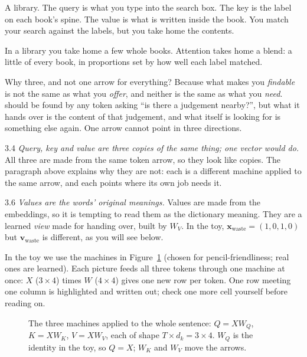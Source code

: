 \Picture A library. The query is what you type into the search box. The key is the label on each book's spine.
The value is what is written inside the book. You match your search against the labels, but you take home the
contents.

\begin{breaks}
In a library you take home a few whole books. Attention takes home a blend: a little of every book, in
proportions set by how well each label matched.
\end{breaks}

\Why Why three, and not one arrow for everything? Because what makes you \emph{findable} is not the same as what
you \emph{offer}, and neither is the same as what you \emph{need}.  should be found by any token asking
``is there a judgement nearby?'', but what it hands over is the content of that judgement, and what 
itself is looking for is something else again. One arrow cannot point in three directions.

\begin{wrongidea}{3.4}
\emph{Query, key and value are three copies of the same thing; one vector would do.} All three are made from the
same token arrow, so they look like copies. The paragraph above explains why they are not: each is a different
machine applied to the same arrow, and each points where its own job needs it.
\end{wrongidea}

\begin{wrongidea}{3.6}
\emph{Values are the words' original meanings.} Values are made from the embeddings, so it is tempting to read
them as the dictionary meaning. They are a learned \emph{view} made for handing over, built by $W_V$. In the toy,
$\bm{x}_{\text{waste}}=(1,0,1,0)$ but $\bm{v}_{\text{waste}}$ is different, as you will see below.
\end{wrongidea}

In the toy we use the machines in Figure~\ref{fig:qkv} (chosen for pencil-friendliness; real ones are
learned). Each picture feeds all three tokens through one machine at once: $X$ ($3\times4$) times $W$ ($4\times4$)
gives one new row per token. One row meeting one column is highlighted and written out; check one more cell
yourself before reading on.
\begin{figure}[!htb]\centering

\caption{The three machines applied to the whole sentence: $Q=XW_Q$, $K=XW_K$, $V=XW_V$, each of shape
$T\times d_k=3\times4$. $W_Q$ is the identity in the toy, so $Q=X$; $W_K$ and $W_V$ move the arrows.}
\label{fig:qkv}
\end{figure}

